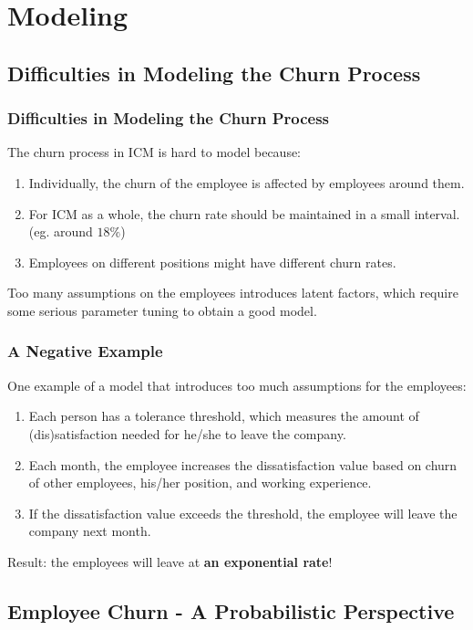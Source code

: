\documentclass{beamer}
\begin{document}
\section{Modeling}
\subsection{Difficulties in Modeling the Churn Process}
\begin{frame}
\frametitle{Difficulties in Modeling the Churn Process}
The churn process in ICM is hard to model because:
\begin{enumerate}
\item Individually, the churn of the employee is affected by employees around them.
\item For ICM as a whole, the churn rate should be maintained in a small interval. (eg. around $18\%$)
\item Employees on different positions might have different churn rates.

\end{enumerate}

Too many assumptions on the employees introduces latent factors, which require some serious parameter tuning to obtain a good model.


\end{frame}

\begin{frame}
\frametitle{A Negative Example}
One example of a model that introduces too much assumptions for the employees:
\begin{enumerate}
\item Each person has a tolerance threshold, which measures the amount of (dis)satisfaction needed for he/she to leave the company.
\item Each month, the employee increases the dissatisfaction value based on churn of other employees, his/her position, and working experience.
\item If the dissatisfaction value exceeds the threshold, the employee will leave the company next month.
\end{enumerate}
Result: the employees will leave at {\bf an exponential rate}!
\end{frame}
\subsection{Employee Churn - A Probabilistic Perspective}
\end{document}
